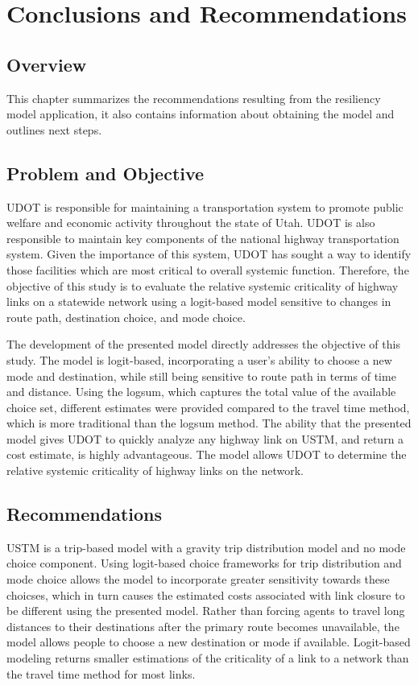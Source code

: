 \chapter{Conclusions and Recommendations}
\label{chp:chapter5}
\graphicspath{{figures/}{figures/chapter5/}}

\section{Overview}

This chapter summarizes the recommendations resulting from the resiliency
model application, it also contains information about obtaining the model and
outlines next steps.

\section{Problem and Objective}

UDOT is responsible for maintaining a
transportation system to promote public welfare and economic activity throughout
the state of Utah. UDOT is also responsible to maintain key components of the
national highway transportation system. Given the importance of this system,
UDOT has sought a way to identify those facilities which are most critical to
overall systemic function. Therefore, the objective of this study is to evaluate the relative systemic
criticality of highway links on a statewide network using a logit-based model
sensitive to changes in route path, destination choice, and mode choice.

The development of the presented model directly addresses the objective of
this study. The model is logit-based, incorporating a user's
ability to choose a new mode and destination, while still being sensitive to route
path in terms of time and distance. Using the logsum, which captures the total
value of the available choice set, different estimates were provided compared to
the travel time method, which is more traditional than the logsum method. The ability that the
presented model gives UDOT to quickly analyze any highway link on USTM, and return a
cost estimate, is highly advantageous. The model allows UDOT to determine
the relative systemic criticality of highway links on the network.

\section{Recommendations}

USTM is a trip-based model with a gravity trip distribution model and no mode
choice component. Using logit-based choice frameworks for trip distribution
and mode choice allows the model to incorporate greater sensitivity towards these
choicses, which in turn causes
the estimated costs associated with link closure to be different using the presented model.
Rather than forcing agents to travel long distances to their destinations after the
primary route becomes unavailable, the model
allows people to choose a new destination or mode if available.
Logit-based modeling returns smaller
estimations of the criticality of a link to a network than the travel time method
for most links.

